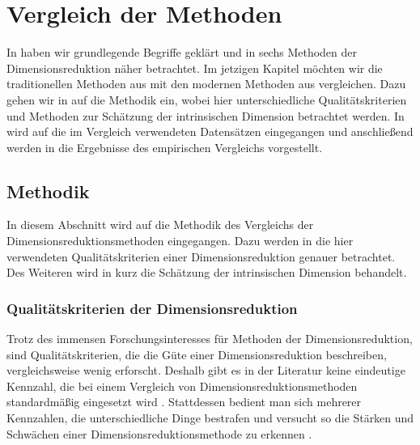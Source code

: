 \chapter{Vergleich der Methoden}
\label{ch:Vergleich}

In  haben wir grundlegende Begriffe geklärt und in
 sechs Methoden der Dimensionsreduktion näher betrachtet. Im jetzigen
Kapitel möchten wir die traditionellen Methoden aus  mit
den modernen Methoden aus  vergleichen. Dazu gehen wir in
 auf die Methodik ein, wobei hier unterschiedliche
Qualitätskriterien und Methoden zur Schätzung der intrinsischen Dimension betrachtet werden. In
 wird auf die im Vergleich verwendeten Datensätzen
eingegangen und anschließend werden in  die Ergebnisse des
empirischen Vergleichs vorgestellt.

\section{Methodik}
\label{ch:Vergleich:sec:Methodik}

In diesem Abschnitt wird auf die Methodik des Vergleichs der Dimensionsreduktionsmethoden
eingegangen. Dazu werden in  die
hier verwendeten Qualitätskriterien einer Dimensionsreduktion genauer betrachtet. Des Weiteren wird
in  kurz die Schätzung der
intrinsischen Dimension behandelt. 
\subsection{Qualitätskriterien der Dimensionsreduktion}
\label{ch:Vergleich:sec:Methodik:subsec:Qualitaetskriterien}
Trotz des immensen Forschungsinteresses für Methoden der Dimensionsreduktion, sind Qualitätskriterien, die die Güte einer Dimensionsreduktion beschreiben, vergleichsweise wenig erforscht. Deshalb gibt es in der Literatur keine eindeutige Kennzahl, die bei einem Vergleich von Dimensionsreduktionsmethoden standardmäßig eingesetzt wird \parencite[vgl.][1 -- 2]{Lee.2009}. Stattdessen bedient man sich mehrerer Kennzahlen, die
unterschiedliche Dinge bestrafen und versucht so die Stärken und Schwächen einer
Dimensionsreduktionsmethode zu erkennen \parencite[486]{Venna.2001}.

